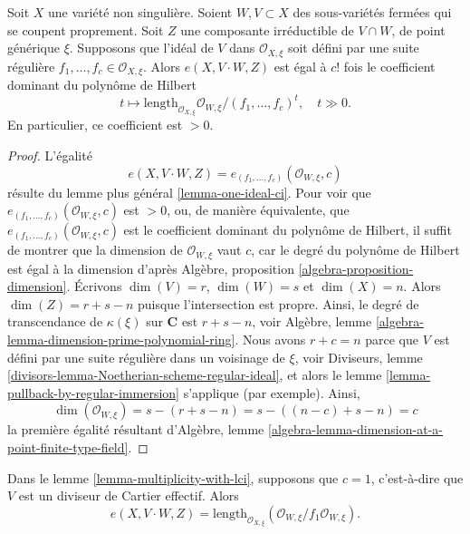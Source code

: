 \begin{lemma}
\label{lemma-multiplicity-with-lci}
Soit $X$ une variété non singulière. Soient $W,V \subset X$ des
sous-variétés fermées qui se coupent proprement. Soit $Z$ une composante irréductible
de $V \cap W$, de point générique $\xi$.
Supposons que l'idéal de $V$ dans $\mathcal{O}_{X, \xi}$ soit défini par
une suite régulière $f_1, \ldots, f_c \in \mathcal{O}_{X, \xi}$.
Alors $e(X, V\cdot W, Z)$ est égal à $c!$ fois le coefficient dominant du
polynôme de Hilbert
$$
t \mapsto \text{length}_{\mathcal{O}_{X, \xi}}
\mathcal{O}_{W, \xi}/(f_1, \ldots, f_c)^t,\quad t \gg 0.
$$
En particulier, ce coefficient est $> 0$.
\end{lemma}

\begin{proof}
L'égalité
$$
e(X, V\cdot W, Z) = e_{(f_1, \ldots, f_c)}(\mathcal{O}_{W, \xi}, c)
$$
résulte du lemme plus général \ref{lemma-one-ideal-ci}.
Pour voir que $e_{(f_1, \ldots, f_c)}(\mathcal{O}_{W, \xi}, c)$ est
$> 0$, ou, de manière équivalente, que $e_{(f_1, \ldots, f_c)}(\mathcal{O}_{W, \xi}, c)$
est le coefficient dominant du polynôme de Hilbert,
il suffit de montrer que la
dimension de $\mathcal{O}_{W, \xi}$ vaut $c$, car le degré du
polynôme de Hilbert est égal à la dimension d'après
Algèbre, proposition \ref{algebra-proposition-dimension}.
Écrivons $\dim(V) = r$, $\dim(W) = s$ et $\dim(X) = n$. Alors
$\dim(Z) = r + s - n$ puisque l'intersection est propre. Ainsi,
le degré de transcendance de $\kappa(\xi)$ sur $\mathbf{C}$ est
$r + s - n$, voir Algèbre, lemme
\ref{algebra-lemma-dimension-prime-polynomial-ring}.
Nous avons $r + c = n$ parce que $V$ est défini par une suite régulière
dans un voisinage de $\xi$, voir
Diviseurs, lemme \ref{divisors-lemma-Noetherian-scheme-regular-ideal},
et alors le lemme \ref{lemma-pullback-by-regular-immersion}
s'applique (par exemple). Ainsi,
$$
\dim(\mathcal{O}_{W, \xi}) = s - (r + s - n) = s - ((n - c) + s - n) = c
$$
la première égalité résultant d'Algèbre, lemme
\ref{algebra-lemma-dimension-at-a-point-finite-type-field}.
\end{proof}

\begin{lemma}
\label{lemma-multiplicity-with-effective-Cartier-divisor}
Dans le lemme \ref{lemma-multiplicity-with-lci}, supposons que $c = 1$, c'est-à-dire que $V$
est un diviseur de Cartier effectif. Alors
$$
e(X, V \cdot W, Z) =
\text{length}_{\mathcal{O}_{X, \xi}}
(\mathcal{O}_{W, \xi}/f_1\mathcal{O}_{W, \xi}).
$$
\end{lemma}

